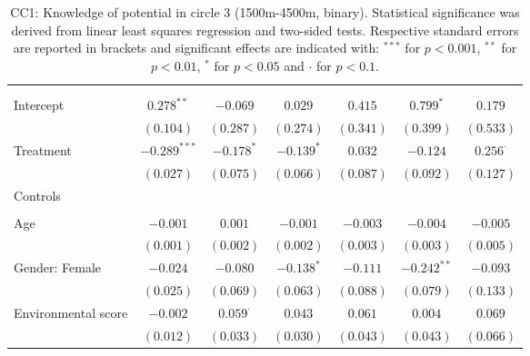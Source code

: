 \begin{center}
\begin{small}
\begin{longtable}{l@{} c@{} c@{} c@{} c@{} c@{} c@{}}
\hline
\endhead
\hline
\endfoot
\hline
\multicolumn{7}{l}{\tiny{
}}\\
\caption{CC1: Knowledge of potential in circle 3 (1500m-4500m, binary). Statistical significance was derived from linear least squares regression and two-sided tests. Respective standard errors are reported in brackets and significant effects are indicated with: $^{***}$ for $p < 0.001$, $^{**}$ for $p < 0.01$, $^*$ for $p < 0.05$ and $\cdot$ for $p < 0.1$.}
\label{table:coefficients}
\endlastfoot \\
Intercept                           & $0.278^{**}$    & $-0.069$        & $0.029$         & $0.415$   & $0.799^{*}$   & $0.179$         \\
                                    & $(0.104)$       & $(0.287)$       & $(0.274)$       & $(0.341)$ & $(0.399)$     & $(0.533)$       \\
Treatment                           & $-0.289^{***}$  & $-0.178^{*}$    & $-0.139^{*}$    & $0.032$   & $-0.124$      & $0.256^{\cdot}$ \\
                                    & $(0.027)$       & $(0.075)$       & $(0.066)$       & $(0.087)$ & $(0.092)$     & $(0.127)$       \\
Controls                            &                 &                 &                 &           &               &                 \\
                                    &                 &                 &                 &           &               &                 \\
\quad Age                           & $-0.001$        & $0.001$         & $-0.001$        & $-0.003$  & $-0.004$      & $-0.005$        \\
                                    & $(0.001)$       & $(0.002)$       & $(0.002)$       & $(0.003)$ & $(0.003)$     & $(0.005)$       \\
\quad Gender: Female                & $-0.024$        & $-0.080$        & $-0.138^{*}$    & $-0.111$  & $-0.242^{**}$ & $-0.093$        \\
                                    & $(0.025)$       & $(0.069)$       & $(0.063)$       & $(0.088)$ & $(0.079)$     & $(0.133)$       \\
\quad Environmental score           & $-0.002$        & $0.059^{\cdot}$ & $0.043$         & $0.061$   & $0.004$       & $0.069$         \\
                                    & $(0.012)$       & $(0.033)$       & $(0.030)$       & $(0.043)$ & $(0.043)$     & $(0.066)$       \\

\end{longtable}
\end{small}
\end{center}
